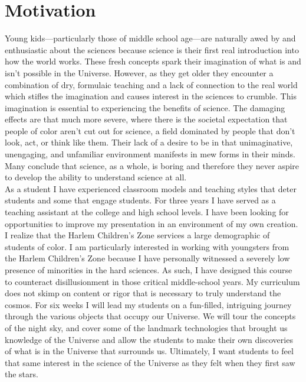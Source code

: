 \section*{Motivation}

Young kids---particularly those of middle school age---are naturally awed by and enthusiastic about the sciences because science is their first real introduction into how the world works. These fresh concepts spark their imagination of what is and isn't possible in the Universe. However, as they get older they encounter a combination of dry, formulaic teaching and a lack of connection to the real world which stifles the imagination and causes interest in the sciences to crumble. This imagination is essential to experiencing the benefits of science. The damaging effects are that much more severe, where there is the societal expectation that people of color aren't cut out for science, a field dominated by people that don't look, act, or think like them. Their lack of a desire to be in that unimaginative, unengaging, and unfamiliar environment manifests in mew forms in their minds. Many conclude that science, as a whole, is boring and therefore they never aspire to develop the ability to understand science at all.\\

As a student I have experienced classroom models and teaching styles that deter students and some that engage students. For three years I have served as a teaching assistant at the college and high school levels. I have been looking for opportunities to improve my presentation in an environment of my own creation.  I realize that the Harlem Children's Zone services a large demographic of students of color. I am particularly interested in working with youngsters from the Harlem Children's Zone because I have personally witnessed a severely low presence of minorities in the hard sciences.  As such, I have designed this course to counteract disillusionment in those critical middle-school years. My curriculum does not skimp on content or rigor that is necessary to truly understand the cosmos. For six weeks I will lead my students on a fun-filled, intriguing journey through the various objects that occupy our Universe. We will tour the concepts of the night sky, and cover some of the landmark technologies that brought us knowledge of the Universe and allow the students to make their own discoveries of what is in the Universe that surrounds us. Ultimately, I want students to feel that same interest in the science of the Universe as they felt when they first saw the stars.\\




